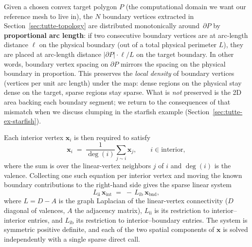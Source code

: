 \documentclass[11pt]{article}
\begin{document}
Given a chosen convex target polygon $P$ (the computational domain
we want our reference mesh to live in), the $N$ boundary vertices
extracted in Section~\ref{sec:tutte-topology} are distributed
monotonically around~$\partial P$ by \textbf{proportional arc
length}: if two consecutive boundary vertices are at arc-length
distance $\ell$ on the physical boundary (out of a total physical
perimeter $L$), they are placed at arc-length distance
$|\partial P| \cdot \ell / L$ on the target boundary. In other
words, boundary vertex spacing on $\partial P$ mirrors the
spacing on the physical boundary in proportion. This preserves
the \emph{local density} of boundary vertices (vertices per
unit arc length) under the map: dense regions on the physical
stay dense on the target, sparse regions stay sparse. What is
\emph{not} preserved is the 2D area backing each boundary
segment; we return to the consequences of that mismatch when
we discuss clumping in the starfish example
(Section~\ref{sec:tutte-ex-starfish}).

Each interior vertex
$\mathbf{x}_i$ is then required to satisfy
\begin{equation}
  \mathbf{x}_i \;=\; \frac{1}{\deg(i)} \sum_{j \sim i} \mathbf{x}_j,
  \qquad i \in \text{interior},
  \label{eq:tutte-bary}
\end{equation}
where the sum is over the linear-vertex neighbors $j$ of $i$ and
$\deg(i)$ is the valence. Collecting one such equation per interior
vertex and moving the known boundary contributions to the
right-hand side gives the sparse linear system
\begin{equation}
  L_{\mathrm{ii}}\, \mathbf{x}_{\mathrm{int}}
    \;=\; -\, L_{\mathrm{ib}}\, \mathbf{x}_{\mathrm{bnd}},
  \label{eq:tutte-linear}
\end{equation}
where $L = D - A$ is the graph Laplacian of the linear-vertex
connectivity ($D$ diagonal of valences, $A$ the adjacency matrix),
$L_{\mathrm{ii}}$ is its restriction to interior--interior entries,
and $L_{\mathrm{ib}}$ its restriction to interior--boundary entries.
The system is symmetric positive definite, and each of the two
spatial components of $\mathbf{x}$ is solved independently with a
single sparse direct call.
\end{document}
